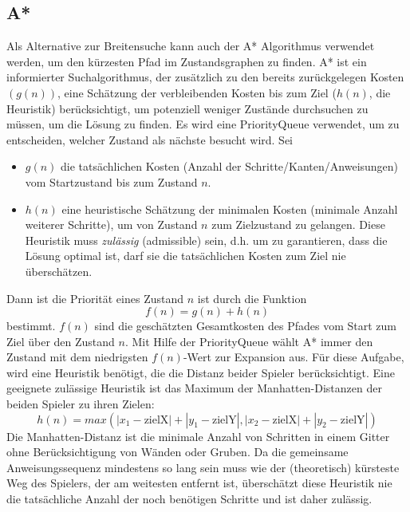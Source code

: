 \documentclass[a4paper,10pt,ngerman]{scrartcl}
\begin{document}
\subsection{A*}
Als Alternative zur Breitensuche kann auch der A* Algorithmus verwendet werden, um den kürzesten Pfad im Zustandsgraphen zu finden. A* ist ein informierter Suchalgorithmus, der zusätzlich zu den bereits zurückgelegen Kosten $(g(n))$, eine Schätzung der verbleibenden Kosten bis zum Ziel ($h(n)$, die Heuristik) berücksichtigt, um potenziell weniger Zustände durchsuchen zu müssen, um die Lösung zu finden.  
\newline
Es wird eine PriorityQueue verwendet, um zu entscheiden, welcher Zustand als nächste besucht wird. Sei 
\begin{itemize}
  \item $g(n)$ die tatsächlichen Kosten (Anzahl der Schritte/Kanten/Anweisungen) vom Startzustand bis zum Zustand $n$. 
  \item $h(n)$ eine heuristische Schätzung der minimalen Kosten (minimale Anzahl weiterer Schritte), um von Zustand $n$ zum Zielzustand zu gelangen. Diese Heuristik muss \textit{zulässig} (admissible) sein, d.h. um zu garantieren, dass die Lösung optimal ist, darf sie die tatsächlichen Kosten zum Ziel nie überschätzen.  
\end{itemize}
Dann ist die Priorität eines Zustand $n$ ist durch die Funktion 
\begin{equation}
  f(n) = g(n) + h(n) 
  \label{1}
\end{equation}
bestimmt. $f(n)$ sind die geschätzten Gesamtkosten des Pfades vom Start zum Ziel über den Zustand $n$. Mit Hilfe der PriorityQueue wählt A* immer den Zustand mit dem niedrigsten $f(n)$-Wert zur Expansion aus.  
Für diese Aufgabe, wird eine Heuristik benötigt, die die Distanz beider Spieler berücksichtigt. Eine geeignete zulässige Heuristik ist das Maximum der Manhatten-Distanzen der beiden Spieler zu ihren Zielen:
\begin{equation}
  h(n) = max( |x_1 - \text{zielX}| + |y_1 - \text{zielY}|, |x_2 - \text{zielX}| + |y_2 - \text{zielY}| ) 
  \label{2}
\end{equation}
Die Manhatten-Distanz ist die minimale Anzahl von Schritten in einem Gitter ohne Berücksichtigung von Wänden oder Gruben. Da die gemeinsame Anweisungssequenz mindestens so lang sein muss wie der (theoretisch) kürsteste Weg des Spielers, der am weitesten entfernt ist, überschätzt diese Heuristik nie die tatsächliche Anzahl der noch benötigen Schritte und ist daher zulässig.
\end{document}
